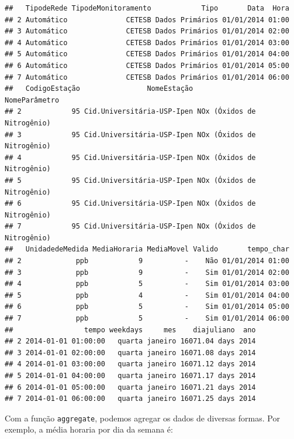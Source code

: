 \documentclass[]{book}
\newenvironment{Shaded}{\begin{snugshade}}{\end{snugshade}}
\newcommand{\KeywordTok}[1]{\textcolor[rgb]{0.13,0.29,0.53}{\textbf{#1}}}
\newcommand{\DataTypeTok}[1]{\textcolor[rgb]{0.13,0.29,0.53}{#1}}
\newcommand{\StringTok}[1]{\textcolor[rgb]{0.31,0.60,0.02}{#1}}
\newcommand{\OperatorTok}[1]{\textcolor[rgb]{0.81,0.36,0.00}{\textbf{#1}}}
\newcommand{\NormalTok}[1]{#1}
\theoremstyle{definition}
\theoremstyle{definition}
\theoremstyle{definition}
\theoremstyle{remark}
\begin{document}
\begin{verbatim}
##   TipodeRede TipodeMonitoramento            Tipo       Data  Hora
## 2 Automático              CETESB Dados Primários 01/01/2014 01:00
## 3 Automático              CETESB Dados Primários 01/01/2014 02:00
## 4 Automático              CETESB Dados Primários 01/01/2014 03:00
## 5 Automático              CETESB Dados Primários 01/01/2014 04:00
## 6 Automático              CETESB Dados Primários 01/01/2014 05:00
## 7 Automático              CETESB Dados Primários 01/01/2014 06:00
##   CodigoEstação                NomeEstação              NomeParâmetro
## 2            95 Cid.Universitária-USP-Ipen NOx (Óxidos de Nitrogênio)
## 3            95 Cid.Universitária-USP-Ipen NOx (Óxidos de Nitrogênio)
## 4            95 Cid.Universitária-USP-Ipen NOx (Óxidos de Nitrogênio)
## 5            95 Cid.Universitária-USP-Ipen NOx (Óxidos de Nitrogênio)
## 6            95 Cid.Universitária-USP-Ipen NOx (Óxidos de Nitrogênio)
## 7            95 Cid.Universitária-USP-Ipen NOx (Óxidos de Nitrogênio)
##   UnidadedeMedida MediaHoraria MediaMovel Valido       tempo_char
## 2             ppb            9          -    Não 01/01/2014 01:00
## 3             ppb            9          -    Sim 01/01/2014 02:00
## 4             ppb            5          -    Sim 01/01/2014 03:00
## 5             ppb            4          -    Sim 01/01/2014 04:00
## 6             ppb            5          -    Sim 01/01/2014 05:00
## 7             ppb            5          -    Sim 01/01/2014 06:00
##                 tempo weekdays     mes    diajuliano  ano
## 2 2014-01-01 01:00:00   quarta janeiro 16071.04 days 2014
## 3 2014-01-01 02:00:00   quarta janeiro 16071.08 days 2014
## 4 2014-01-01 03:00:00   quarta janeiro 16071.12 days 2014
## 5 2014-01-01 04:00:00   quarta janeiro 16071.17 days 2014
## 6 2014-01-01 05:00:00   quarta janeiro 16071.21 days 2014
## 7 2014-01-01 06:00:00   quarta janeiro 16071.25 days 2014
\end{verbatim}

Com a função \texttt{aggregate}, podemos agregar os dados de diversas
formas. Por exemplo, a média horaria por dia da semana é:

\begin{Shaded}
\end{Shaded}
\end{document}

